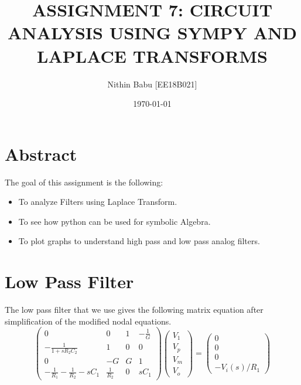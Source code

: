 \documentclass[11pt, a4paper]{article}
\title{ASSIGNMENT 7: CIRCUIT ANALYSIS USING SYMPY AND LAPLACE TRANSFORMS}
\author{Nithin Babu [EE18B021]}
\date{\today}
\begin{document}
\maketitle

\section*{Abstract}
The goal of this assignment is the following:
\begin{itemize}
\item To analyze Filters using Laplace Transform.
\item To see how python can be used for symbolic Algebra.
\item To plot graphs to understand high pass and low pass analog filters.
\end{itemize}

\section*{Low Pass Filter}
The low pass filter that we use gives the following matrix equation after simplification of the modified nodal equations.
\[\begin{pmatrix} 0 & 0 & 1 & -\frac{1}{G} \\ -\frac{1}{1+sR_2C_2} & 1 & 0 & 0 \\ 0 & -G & G & 1 \\ -\frac{1}{R_1}-\frac{1}{R_2}-sC_1 & \frac{1}{R_2} & 0 & sC_1 \end{pmatrix}\begin{pmatrix} V_1 \\ V_p \\ V_m \\ V_o \end{pmatrix} = \begin{pmatrix} 0 \\ 0 \\ 0 \\ -V_i(s)/R_1 \end{pmatrix}\]
\end{document}
